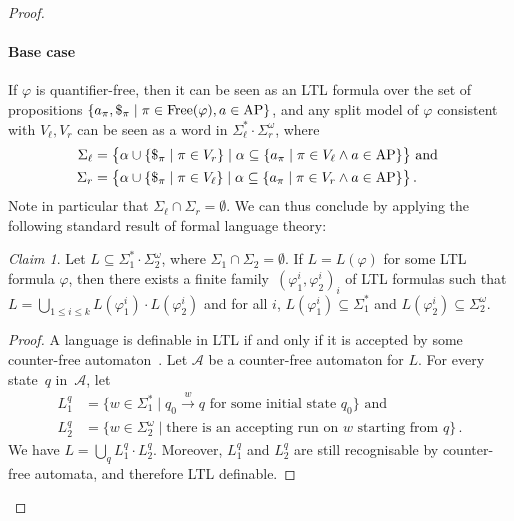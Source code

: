 \documentclass[dvipsnames,10pt,a4paper]{amsart}
\theoremstyle{definition}
\theoremstyle{remark}
\newtheorem{clm}{Claim}
\newcommand\AP{\textup{AP}}
\newcommand\Free{\textup{Free}}
\newcommand\Vl{V_\ell}
\newcommand\Vr{V_r}
\newcommand\Sigmal{\Sigma_\ell}
\newcommand\Sigmar{\Sigma_r}
\begin{document}
\begin{proof}
  \paragraph{Base case}
  If $\varphi$ is quantifier-free, then it can be seen as an LTL formula
  over the set of propositions
  $\{a_\pi, \$_\pi \mid \pi \in \Free(\varphi), a \in \AP\}$,
  and any split model of $\varphi$ consistent with $\Vl,\Vr$
  can be seen as a word in $\Sigma_\ell^\ast \cdot \Sigma_r^\omega$,
  where
  \begin{align*}
    \Sigmal & = \big\{ \alpha \cup \{\$_\pi \mid \pi \in \Vr\} \mid 
    \alpha \subseteq {\{a_\pi \mid \pi \in \Vl \land a \in \AP\}} \big\} \text{ and }\\
    \Sigmar & = \big\{ \alpha \cup \{\$_\pi \mid \pi \in \Vl\} \mid 
    \alpha \subseteq {\{a_\pi \mid \pi \in \Vr \land a \in \AP\}} \big\} \, .
  \end{align*}
  Note in particular that $\Sigmal \cap \Sigmar = \emptyset$.
  We can thus conclude by applying the following standard result of
  formal language theory:
  
  \begin{clm}\label{lem:splitLTL}
    Let $L \subseteq \Sigma_1^\ast \cdot \Sigma_2^\omega$, where
    $\Sigma_1 \cap \Sigma_2 = \emptyset$.
    If $L = L(\varphi)$ for some LTL formula $\varphi$, then there exists a finite family~$(\varphi^i_1, \varphi^i_2)_{i}$  of LTL formulas 
    such that $L = \bigcup_{1 \le i \le k} L(\varphi^i_1) \cdot L(\varphi^i_2)$
    and for all $i$, $L(\varphi^i_1) \subseteq \Sigma_1^\ast$
    and $L(\varphi^i_2) \subseteq \Sigma_2^\omega$.
  \end{clm}

  \begin{proof}
    A language is definable in LTL if and only if it is accepted by some
    counter-free automaton~\cite{DG08,Thomas81}.
    Let $\mathcal{A}$ be a counter-free automaton for $L$.
    For every state~$q$ in~$\mathcal{A}$, let
    \begin{align*}
      L^q_1 & = \{w \in \Sigma_1^\ast \mid q_0 \xrightarrow{w} q
              \text{ for some initial state $q_0$}\} \text{ and }\\
      L^q_2 & = \{w \in \Sigma_2^\omega \mid \text{there is an accepting run
              on $w$ starting from $q$}\} \, .
    \end{align*}
    We have $L = \bigcup_q L^q_1\cdot  L^q_2$.
    Moreover, $L^q_1$ and $L^q_2$ are still recognisable by counter-free
    automata, and therefore LTL definable.
  \end{proof}
  

\end{proof}
\end{document}

